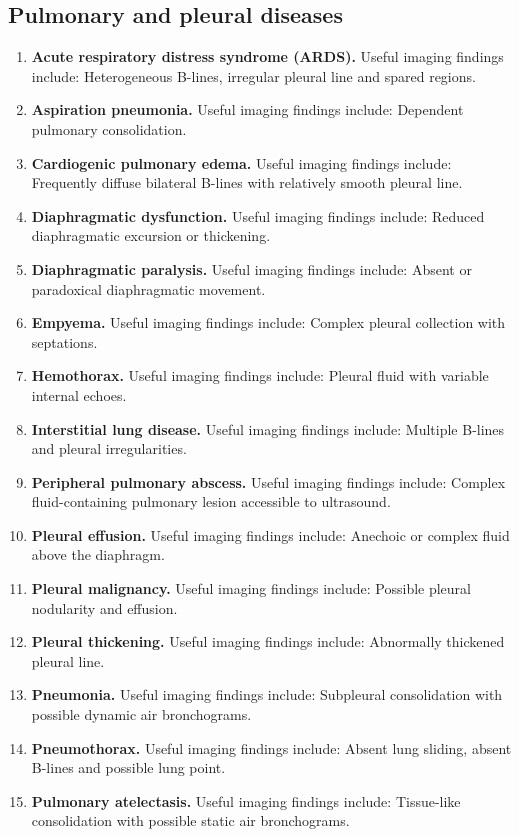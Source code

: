 \subsection{Pulmonary and pleural diseases}
\begin{enumerate}[leftmargin=*,itemsep=0.45em,topsep=0.4em]
\item \textbf{Acute respiratory distress syndrome (ARDS).} Useful imaging findings include: Heterogeneous B-lines, irregular pleural line and spared regions.
\item \textbf{Aspiration pneumonia.} Useful imaging findings include: Dependent pulmonary consolidation.
\item \textbf{Cardiogenic pulmonary edema.} Useful imaging findings include: Frequently diffuse bilateral B-lines with relatively smooth pleural line.
\item \textbf{Diaphragmatic dysfunction.} Useful imaging findings include: Reduced diaphragmatic excursion or thickening.
\item \textbf{Diaphragmatic paralysis.} Useful imaging findings include: Absent or paradoxical diaphragmatic movement.
\item \textbf{Empyema.} Useful imaging findings include: Complex pleural collection with septations.
\item \textbf{Hemothorax.} Useful imaging findings include: Pleural fluid with variable internal echoes.
\item \textbf{Interstitial lung disease.} Useful imaging findings include: Multiple B-lines and pleural irregularities.
\item \textbf{Peripheral pulmonary abscess.} Useful imaging findings include: Complex fluid-containing pulmonary lesion accessible to ultrasound.
\item \textbf{Pleural effusion.} Useful imaging findings include: Anechoic or complex fluid above the diaphragm.
\item \textbf{Pleural malignancy.} Useful imaging findings include: Possible pleural nodularity and effusion.
\item \textbf{Pleural thickening.} Useful imaging findings include: Abnormally thickened pleural line.
\item \textbf{Pneumonia.} Useful imaging findings include: Subpleural consolidation with possible dynamic air bronchograms.
\item \textbf{Pneumothorax.} Useful imaging findings include: Absent lung sliding, absent B-lines and possible lung point.
\item \textbf{Pulmonary atelectasis.} Useful imaging findings include: Tissue-like consolidation with possible static air bronchograms.

\end{enumerate}
